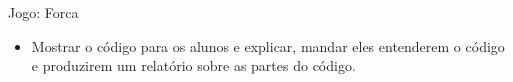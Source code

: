\begin{frame}
	\begin{block}{Jogo: Forca}
		\begin{itemize}
			\item Mostrar o código para os alunos e explicar, mandar eles entenderem o código e produzirem um relatório sobre as partes do código.
		\end{itemize}
	\end{block}
\end{frame}